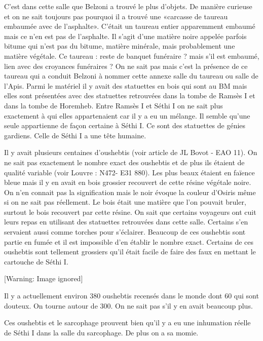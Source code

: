 \documentclass{article}
\begin{document}
C’est dans cette salle que Belzoni a trouvé le plus d’objets. De manière
curieuse et on ne sait toujours pas pourquoi il a trouvé une «carcasse
de taureau embaumée avec de l’asphalte». C’était un taureau entier
apparemment embaumé mais ce n’en est pas de l’asphalte. Il s’agit d’une
matière noire appelée parfois bitume qui n’est pas du bitume, matière
minérale, mais probablement  une matière végétale. Ce taureau : reste
de banquet funéraire ? mais s’il est embaumé, lien avec des croyances
funéraires ? On ne sait pas mais c’est la présence de ce taureau qui a
conduit Belzoni à nommer cette annexe salle du taureau ou salle de
l’Apis. Parmi le matériel il y avait des statuettes en bois qui sont au
BM mais elles sont présentées avec des statuettes retrouvées dans la
tombe de Ramsès I et dans la tombe de Horemheb. Entre Ramsès I et Séthi
I on ne sait plus exactement à qui elles appartenaient car il y a eu un
mélange. Il semble qu’une seule appartienne de façon certaine à Séthi
I. Ce sont des statuettes de génies gardiens. Celle de Séthi I a une
tête humaine.

Il y avait plusieurs centaines d’oushebtis (voir article de JL Bovot -
EAO 11). On ne sait pas exactement le nombre exact des oushebtis et de
plus ils étaient de qualité variable (voir Louvre : N472- E31 880). Les
plus beaux étaient en faïence bleue mais il y en avait en bois grossier
recouvert de cette résine végétale noire.  On n’en connait pas la
signification mais le noir évoque la couleur d’Osiris même si on ne
sait pas réellement. Le bois était une matière que l’on pouvait bruler,
surtout le bois recouvert par cette résine. On sait que certains
voyageurs ont cuit leurs repas en utilisant des statuettes retrouvées
dans cette salle. Certains s’en servaient aussi comme torches pour
s’éclairer. Beaucoup de ces oushebtis sont partie en fumée et il est
impossible d’en établir le nombre exact. Certains de ces oushebtis sont
tellement grossiers qu’il était facile de faire des faux en mettant le
cartouche de Séthi I. 

  [Warning: Image ignored] %
 

Il y a actuellement environ 380 oushebtis recensés dans le monde dont 60
qui sont douteux. On tourne autour de 300. On ne sait pas s’il y en
avait beaucoup plus. 

Ces oushebtis et le sarcophage prouvent bien qu’il y a eu une inhumation
réelle de Séthi I dans la salle du sarcophage. De plus on a sa momie.
\end{document}
